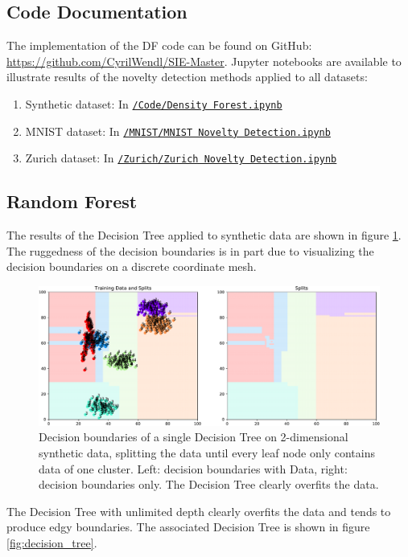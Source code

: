 \documentclass[10pt]{article}
\begin{document}
\subsection{Code Documentation}
\label{subsec:implementation}
The implementation of the \acrlong{DF} code can be found on GitHub: \url{https://github.com/CyrilWendl/SIE-Master}. Jupyter notebooks are available to illustrate results of the novelty detection methods applied to all datasets:
\begin{enumerate}
    \item Synthetic dataset: In  \href{https://github.com/CyrilWendl/SIE-Master/blob/master/Code/Density%20Forest.ipynb}{\texttt{/Code/Density Forest.ipynb}}
    \item \gls{MNIST} dataset: In \href{https://github.com/CyrilWendl/SIE-Master/blob/master/MNIST/MNIST%20Novelty%20Detection.ipynb}{\texttt{/MNIST/MNIST Novelty Detection.ipynb}}
    \item Zurich dataset: In \href{https://github.com/CyrilWendl/SIE-Master/blob/master/Zurich/Zurich%20Dataset%20Novelty%20Detection.ipynb}{\texttt{/Zurich/Zurich Novelty Detection.ipynb}}
\end{enumerate}

\subsection{Random Forest}
\label{app:rf}
The results of the Decision Tree applied to synthetic data are shown in figure \ref{fig:decision-boundaries}. The ruggedness of the decision boundaries is in part due to visualizing the decision boundaries on a discrete coordinate mesh.

\begin{figure}[H]
    \centering
    \includegraphics[width=\textwidth]{decision_boundaries}
    \caption{Decision boundaries of a single Decision Tree on 2-dimensional synthetic data, splitting the data until every leaf node only contains data of one cluster. Left: decision boundaries with Data, right: decision boundaries only. The Decision Tree clearly overfits the data.}
    \label{fig:decision-boundaries}
\end{figure}
The Decision Tree with unlimited depth clearly overfits the data and tends to produce edgy boundaries. The associated Decision Tree is shown in figure \ref{fig:decision_tree}.
\end{document}
